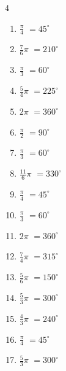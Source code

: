 \begin{multicols}{4}
\begin{enumerate}
  \item $\displaystyle \frac{\pi}{4}$
        $\displaystyle =45^{\circ}$

  \item $\displaystyle \frac{7}{6}\pi$
        $\displaystyle =210^{\circ}$

  \item $\displaystyle \frac{\pi}{3}$
        $\displaystyle =60^{\circ}$

  \item $\displaystyle \frac{5}{4}\pi$
        $\displaystyle =225^{\circ}$

  \item $\displaystyle 2\pi$
        $\displaystyle =360^{\circ}$

  \item $\displaystyle \frac{\pi}{2}$
        $\displaystyle =90^{\circ}$

  \item $\displaystyle \frac{\pi}{3}$
        $\displaystyle =60^{\circ}$

  \item $\displaystyle \frac{11}{6}\pi$
        $\displaystyle =330^{\circ}$

  \item $\displaystyle \frac{\pi}{4}$
        $\displaystyle =45^{\circ}$

  \item $\displaystyle \frac{\pi}{3}$
        $\displaystyle =60^{\circ}$

  \item $\displaystyle 2\pi$
        $\displaystyle =360^{\circ}$

\columnbreak %

  \item $\displaystyle \frac{7}{4}\pi$
        $\displaystyle =315^{\circ}$

  \item $\displaystyle \frac{5}{6}\pi$
        $\displaystyle =150^{\circ}$

  \item $\displaystyle \frac{5}{3}\pi$
        $\displaystyle =300^{\circ}$

  \item $\displaystyle \frac{4}{3}\pi$
        $\displaystyle =240^{\circ}$

  \item $\displaystyle \frac{\pi}{4}$
        $\displaystyle =45^{\circ}$

  \item $\displaystyle \frac{5}{3}\pi$
        $\displaystyle =300^{\circ}$


\end{enumerate}
\end{multicols}
